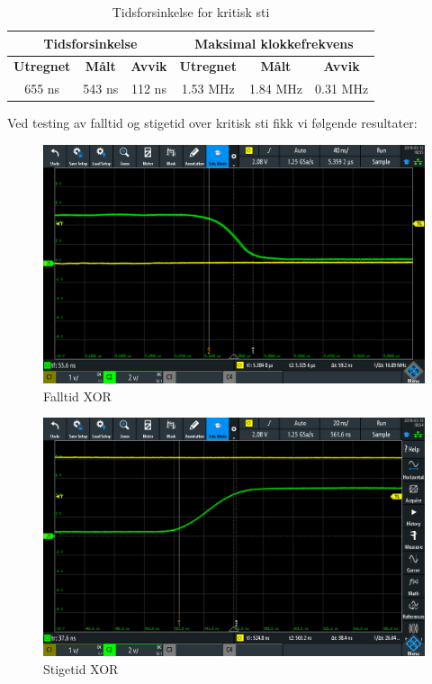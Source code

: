 \begin{table}[!htb]
  \centering
  \caption{Tidsforsinkelse for kritisk sti}
  \begin{tabular}{c c c|c c c}
    \multicolumn{3}{c|}{\textbf{Tidsforsinkelse}} & \multicolumn{3}{c}{\textbf{Maksimal klokkefrekvens}} \\ \hline
    \textbf{Utregnet} & \textbf{Målt} & \textbf{Avvik} & \textbf{Utregnet} & \textbf{Målt} & \textbf{Avvik} \\ \hline
    655 ns & 543 ns & 112 ns & 1.53 MHz & 1.84 MHz & 0.31 MHz\\
  \end{tabular}
\end{table}

Ved testing av falltid og stigetid over kritisk sti fikk vi følgende resultater:

\begin{figure}
  \centering
  \caption{Falltid XOR}
  \includegraphics[width=14cm]{Bilder/Fall.png}
\end{figure}

\begin{figure}
  \centering
  \caption{Stigetid XOR}
  \includegraphics[width=14cm]{Bilder/Rise.png}
\end{figure}

